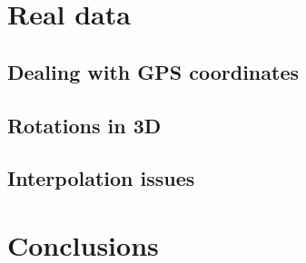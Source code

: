 \documentclass{amsart}
\begin{document}
\section{Real data}
\subsection{Dealing with GPS coordinates}
\subsection{Rotations in 3D}
\subsection{Interpolation issues}

\section{Conclusions}



\end{document}
